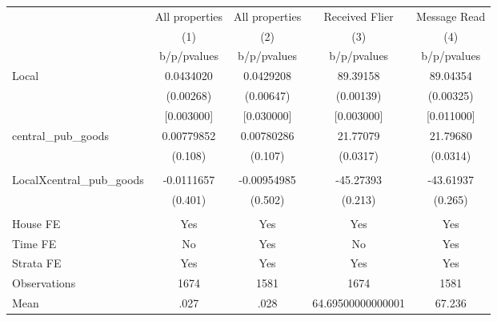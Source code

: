 {
\def\sym#1{\ifmmode^{#1}\else\(^{#1}\)\fi}
\begin{tabular}{l*{4}{c}}
\hline\hline
                &\multicolumn{1}{c}{All properties}&\multicolumn{1}{c}{All properties}&\multicolumn{1}{c}{Received Flier}&\multicolumn{1}{c}{Message Read}\\
                &\multicolumn{1}{c}{(1)}&\multicolumn{1}{c}{(2)}&\multicolumn{1}{c}{(3)}&\multicolumn{1}{c}{(4)}\\
                &b/p/pvalues&b/p/pvalues&b/p/pvalues&b/p/pvalues\\
\hline
Local           &0.0434020&0.0429208& 89.39158& 89.04354\\
                &(0.00268)&(0.00647)&(0.00139)&(0.00325)\\
                &[0.003000]&[0.030000]&[0.003000]&[0.011000]\\
central\_pub\_goods&0.00779852&0.00780286& 21.77079& 21.79680\\
                &  (0.108)&  (0.107)& (0.0317)& (0.0314)\\
                &         &         &         &         \\
LocalXcentral\_pub\_goods&-0.0111657&-0.00954985&-45.27393&-43.61937\\
                &  (0.401)&  (0.502)&  (0.213)&  (0.265)\\
                &         &         &         &         \\
House FE        &      Yes&      Yes&      Yes&      Yes\\
Time FE         &       No&      Yes&       No&      Yes\\
Strata FE       &      Yes&      Yes&      Yes&      Yes\\
\hline
Observations    &     1674&     1581&     1674&     1581\\
Mean            &     .027&     .028&64.69500000000001&   67.236\\
\hline\hline
\end{tabular}
}
